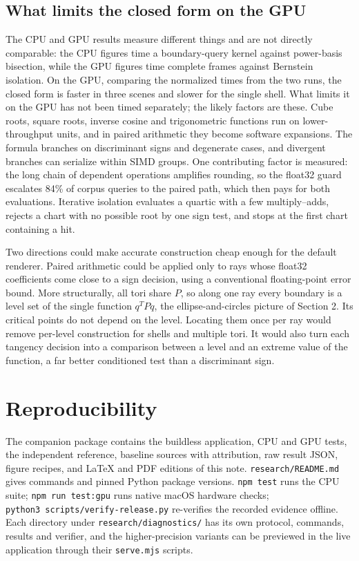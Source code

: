 \documentclass[11pt,a4paper]{article}
\begin{document}
\subsection{What limits the closed form on the
GPU}\label{what-limits-the-closed-form-on-the-gpu}

The CPU and GPU results measure different things and are not directly
comparable: the CPU figures time a boundary-query kernel against
power-basis bisection, while the GPU figures time complete frames
against Bernstein isolation. On the GPU, comparing the normalized times
from the two runs, the closed form is faster in three scenes and slower
for the single shell. What limits it on the GPU has not been timed
separately; the likely factors are these. Cube roots, square roots,
inverse cosine and trigonometric functions run on lower-throughput
units, and in paired arithmetic they become software expansions. The
formula branches on discriminant signs and degenerate cases, and
divergent branches can serialize within SIMD groups. One contributing
factor is measured: the long chain of dependent operations amplifies
rounding, so the float32 guard escalates 84\% of corpus queries to the
paired path, which then pays for both evaluations. Iterative isolation
evaluates a quartic with a few multiply--adds, rejects a chart with no
possible root by one sign test, and stops at the first chart containing
a hit.

Two directions could make accurate construction cheap enough for the
default renderer. Paired arithmetic could be applied only to rays whose
float32 coefficients come close to a sign decision, using a conventional
floating-point error bound. More structurally, all tori share \(P\), so
along one ray every boundary is a level set of the single function
\(q^TPq\), the ellipse-and-circles picture of Section 2. Its critical
points do not depend on the level. Locating them once per ray would
remove per-level construction for shells and multiple tori. It would
also turn each tangency decision into a comparison between a level and
an extreme value of the function, a far better conditioned test than a
discriminant sign.

\section{Reproducibility}\label{reproducibility}

The companion package contains the buildless application, CPU and GPU
tests, the independent reference, baseline sources with attribution, raw
result JSON, figure recipes, and LaTeX and PDF editions of this note.
\texttt{research/README.md} gives commands and pinned Python package
versions. \texttt{npm\ test} runs the CPU suite;
\texttt{npm\ run\ test:gpu} runs native macOS hardware checks;
\texttt{python3\ scripts/verify-release.py} re-verifies the recorded
evidence offline. Each directory under \texttt{research/diagnostics/}
has its own protocol, commands, results and verifier, and the
higher-precision variants can be previewed in the live application
through their \texttt{serve.mjs} scripts.
\end{document}
